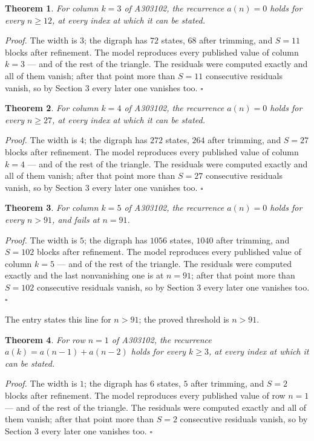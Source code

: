 \documentclass[11pt]{article}
\newtheorem{theorem}{Theorem}
\theoremstyle{definition}
\begin{document}
\begin{theorem} For column $k = 3$ of A303102, the recurrence $a(n) = 0$ holds for every $n \ge 12$, at every index at which it can be stated.\end{theorem}

{\itshape Proof.} The width is $3$; the digraph has $72$ states, $68$ after trimming, and $S = 11$ blocks after refinement. The model reproduces every published value of column $k = 3$ --- and of the rest of the triangle. The residuals were computed exactly and all of them vanish; after that point more than $S = 11$ consecutive residuals vanish, so by Section 3 every later one vanishes too. $\square$

\begin{theorem} For column $k = 4$ of A303102, the recurrence $a(n) = 0$ holds for every $n \ge 27$, at every index at which it can be stated.\end{theorem}

{\itshape Proof.} The width is $4$; the digraph has $272$ states, $264$ after trimming, and $S = 27$ blocks after refinement. The model reproduces every published value of column $k = 4$ --- and of the rest of the triangle. The residuals were computed exactly and all of them vanish; after that point more than $S = 27$ consecutive residuals vanish, so by Section 3 every later one vanishes too. $\square$

\begin{theorem} For column $k = 5$ of A303102, the recurrence $a(n) = 0$ holds for every $n > 91$, and fails at $n = 91$.\end{theorem}

{\itshape Proof.} The width is $5$; the digraph has $1056$ states, $1040$ after trimming, and $S = 102$ blocks after refinement. The model reproduces every published value of column $k = 5$ --- and of the rest of the triangle. The residuals were computed exactly and the last nonvanishing one is at $n = 91$; after that point more than $S = 102$ consecutive residuals vanish, so by Section 3 every later one vanishes too. $\square$

The entry states this line for $n > 91$; the proved threshold is $n > 91$.

\begin{theorem} For row $n = 1$ of A303102, the recurrence $a(k) = a(n-1) + a(n-2)$ holds for every $k \ge 3$, at every index at which it can be stated.\end{theorem}

{\itshape Proof.} The width is $1$; the digraph has $6$ states, $5$ after trimming, and $S = 2$ blocks after refinement. The model reproduces every published value of row $n = 1$ --- and of the rest of the triangle. The residuals were computed exactly and all of them vanish; after that point more than $S = 2$ consecutive residuals vanish, so by Section 3 every later one vanishes too. $\square$
\end{document}
